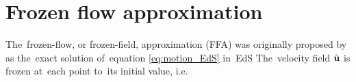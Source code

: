 
\section{Frozen flow approximation}
The~frozen-flow, or frozen-field, approximation (FFA) was originally proposed by \textcite{Matarrese:1992be} as the~exact solution of~equation \eqref{eq:motion_EdS} in~EdS
The~velocity field $\tilde{\mathbf u}$ is frozen at~each point to~its initial value, i.e.

